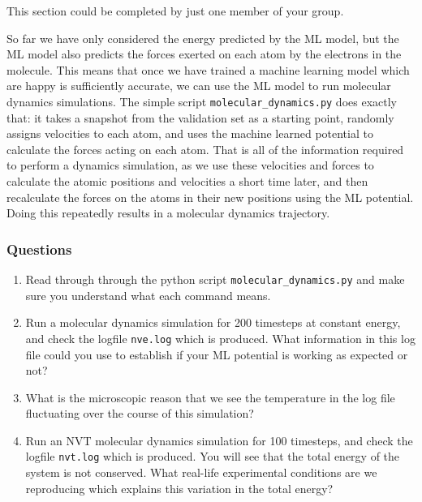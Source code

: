 \documentclass{article}
\begin{document}
This section could be completed by just one member of your group.

So far we have only considered the energy predicted by the ML model, but the ML model also predicts the forces exerted on each atom by the electrons in the molecule. This means that once we have trained a machine learning model which are happy is sufficiently accurate, we can use the ML model to run molecular dynamics simulations. The simple script \verb|molecular_dynamics.py| does exactly that: it takes a snapshot from the validation set as a starting point, randomly assigns velocities to each atom, and uses the machine learned potential to calculate the forces acting on each atom. That is all of the information required to perform a dynamics simulation, as we use these velocities and forces to calculate the atomic positions and velocities a short time later, and then recalculate the forces on the atoms in their new positions using the ML potential. Doing this repeatedly results in a molecular dynamics trajectory.

\subsubsection*{Questions}

\begin{enumerate}

\item Read through through the python script \verb|molecular_dynamics.py| and make sure you understand what each command means.
\item Run a molecular dynamics simulation for 200 timesteps at constant energy, and check the logfile \verb|nve.log| which is produced. What information in this log file could you use to establish if your ML potential is working as expected or not?
\item What is the microscopic reason that we see the temperature in the log file fluctuating over the course of this simulation?
\item Run an NVT molecular dynamics simulation for 100 timesteps, and check the logfile \verb|nvt.log| which is produced. You will see that the total energy of the system is not conserved. What real-life experimental conditions are we reproducing which explains this variation in the total energy?

\end{enumerate}
\end{document}

